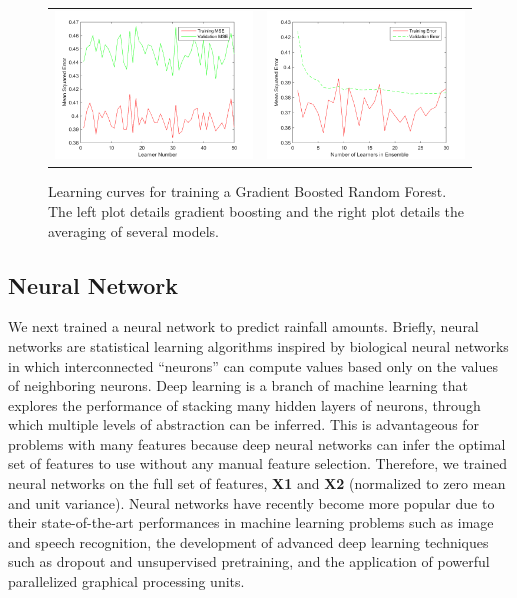 \documentclass[12pt] {article}
\renewcommand{\baselinestretch}{1.2} %
\begin{document}
\renewcommand{\baselinestretch}{1.0} %
\begin{figure}[h!] \centering
\begin{tabular}{cc}
\includegraphics[width=.45\textwidth]{figdir/learnerNumVersusMSE.png} &
\includegraphics[width=.45\textwidth]{figdir/numLearnersVersusMSE2.png} \\
\end{tabular}
\caption{Learning curves for training a Gradient Boosted Random Forest. The left plot details gradient boosting and the right plot details the averaging of several models.}
\end{figure}
\renewcommand{\baselinestretch}{1.2} %
\subsection{Neural Network}
We next trained a neural network to predict rainfall amounts. Briefly, neural networks are statistical learning algorithms inspired by biological neural networks in which interconnected ``neurons'' can compute values based only on the values of neighboring neurons. Deep learning is a branch of machine learning that explores the performance of stacking many hidden layers of neurons, through which multiple levels of abstraction can be inferred. This is advantageous for problems with many features because deep neural networks can infer the optimal set of features to use without any manual feature selection. Therefore, we trained neural networks on the full set of features, \textbf{X1} and \textbf{X2} (normalized to zero mean and unit variance). Neural networks have recently become more popular due to their state-of-the-art performances in machine learning problems such as image and speech recognition, the development of advanced deep learning techniques such as dropout and unsupervised pretraining, and the application of powerful parallelized graphical processing units.
\end{document}
